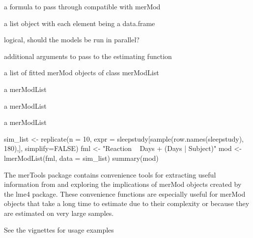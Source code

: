 \documentclass[letterpaper]{book}
\begin{document}
%
\begin{Arguments}
\begin{ldescription}
\item[\code{formula}] a formula to pass through compatible with merMod

\item[\code{data}] a list object with each element being a data.frame

\item[\code{parallel}] logical, should the models be run in parallel?

\item[\code{...}] additional arguments to pass to the estimating function
\end{ldescription}
\end{Arguments}
%
\begin{Value}
a list of fitted merMod objects of class merModList

a merModList

a merModList

a merModList
\end{Value}
%
\begin{Examples}
\begin{ExampleCode}
sim_list <- replicate(n = 10,
        expr = sleepstudy[sample(row.names(sleepstudy), 180),],
        simplify=FALSE)
fml <- "Reaction ~ Days + (Days | Subject)"
mod <- lmerModList(fml, data = sim_list)
summary(mod)
\end{ExampleCode}
\end{Examples}
%
\begin{Description}\relax
The merTools package contains convenience tools for extracting useful
information from and exploring the implications of merMod objects created by
the lme4 package.  These convenience functions are especially useful for
merMod objects that take a long time to estimate due to their complexity or
because they are estimated on very large samples.
\end{Description}
%
\begin{Details}\relax
See the vignettes for usage examples
\end{Details}
%
\end{document}
